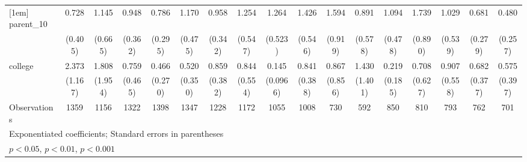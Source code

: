 {\begin{tabular}{l*{16}{c}}
[1em]
parent\_10           &       0.728         &       1.145         &       0.948         &       0.786         &       1.170         &       0.958         &       1.254         &       1.264         &       1.426         &       1.594         &       0.891         &       1.094         &       1.739         &       1.029         &       0.681         &       0.480         \\
                    &     (0.405)         &     (0.665)         &     (0.362)         &     (0.295)         &     (0.475)         &     (0.342)         &     (0.547)         &     (0.523)         &     (0.546)         &     (0.919)         &     (0.578)         &     (0.478)         &     (0.890)         &     (0.539)         &     (0.279)         &     (0.257)         \\
[1em]
college             &       2.373         &       1.808         &       0.759         &       0.466         &       0.520         &       0.859         &       0.844         &       0.145\sym{**} &       0.841         &       0.867         &       1.430         &       0.219         &       0.708         &       0.907         &       0.682         &       0.575         \\
                    &     (1.167)         &     (1.954)         &     (0.465)         &     (0.270)         &     (0.350)         &     (0.382)         &     (0.554)         &    (0.0966)         &     (0.388)         &     (0.856)         &     (1.401)         &     (0.185)         &     (0.627)         &     (0.558)         &     (0.377)         &     (0.397)         \\
\hline
Observations        &        1359         &        1156         &        1322         &        1398         &        1347         &        1228         &        1172         &        1055         &        1008         &         730         &         592         &         850         &         810         &         793         &         762         &         701         \\
\hline\hline
\multicolumn{17}{l}{\footnotesize Exponentiated coefficients; Standard errors in parentheses}\\
\multicolumn{17}{l}{\footnotesize \sym{*} \(p<0.05\), \sym{**} \(p<0.01\), \sym{***} \(p<0.001\)}\\
\end{tabular}
}
